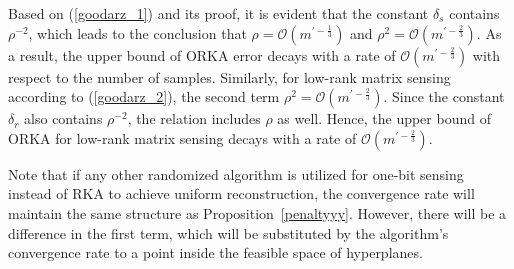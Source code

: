 \documentclass[12pt,draftcls,onecolumn]{IEEEtran}
\newcommand{\Fr}[1]{\textcolor{blue}{#1}}
\begin{document}
Based on (\ref{goodarz_1}) and its proof, it is evident that the constant $\delta_s$ contains $\rho^{-2}$, which leads to the conclusion that $\rho=\mathcal{O}\left(m^{\prime-\frac{1}{3}}\right)$ and $\rho^2=\mathcal{O}\left(m^{\prime-\frac{2}{3}}\right)$. As a result, the upper bound of ORKA error decays with a rate of $\mathcal{O}\left(m^{\prime-\frac{2}{3}}\right)$ with respect to the number of samples.
Similarly, for low-rank matrix sensing according to (\ref{goodarz_2}), the second term $\rho^2=\mathcal{O}\left(m^{\prime-\frac{2}{3}}\right)$. Since the constant $\delta_r$ also contains $\rho^{-2}$, the relation includes $\rho$ as well. Hence, the upper bound of ORKA for low-rank matrix sensing decays with a rate of $\mathcal{O}\left(m^{\prime-\frac{2}{3}}\right)$.

Note that if any other randomized algorithm is utilized for one-bit sensing instead of RKA to achieve uniform reconstruction, the convergence rate will maintain the same structure as Proposition~\ref{penaltyyy}. However, there will be a difference in the first term, which will be substituted by the algorithm's convergence rate to a point inside the feasible space of hyperplanes.

\end{document}
